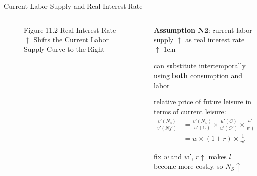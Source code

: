 \documentclass[11pt,aspectratio=43]{beamer}
\let\olditemize=\itemize
\let\endolditemize=\enditemize
\renewenvironment{itemize}{\olditemize \itemsep1em}{\endolditemize}
\theoremstyle{definition}
\begin{document}
\begin{frame}{Current Labor Supply and Real Interest Rate}
\label{slide:Current_Labor_Supply_and_Real_Interest_Rate}
    \begin{columns}
        \begin{column}{0.48\textwidth}
            \begin{figure}
                \caption{\scriptsize Figure 11.2  Real Interest Rate $ \uparrow  $ Shifts the Current Labor Supply Curve to the Right}
            \end{figure}
        \end{column}
        \begin{column}{0.52\textwidth}
            \textbf{Assumption N2}: current labor supply $ \uparrow  $ as real interest rate $ \uparrow  $
            \begin{itemize}
                \item can substitute \alert{intertemporally} using \textbf{both} consumption and labor
                \item \alert{relative price of future leisure in terms of current leisure}:
                    \begin{align*}
                        \frac{v'( N_{S} )}{v'( N_{S}' )}
                            & = \frac{v'( N_{S} )}{u'( C )} \times \frac{u'( C )}{u'( C' )} \times \frac{u'( C' )}{v'( N_{S}' )}
                        \\
                            & = w \times ( 1+r ) \times \frac{1}{w'}
                    \end{align*}
                \item fix $ w $ and $ w' $, $ r \uparrow  $ makes $ l $ become more costly, so $ N_{S} \uparrow  $
            \end{itemize}
        \end{column}
    \end{columns}
\end{frame}
\end{document}
